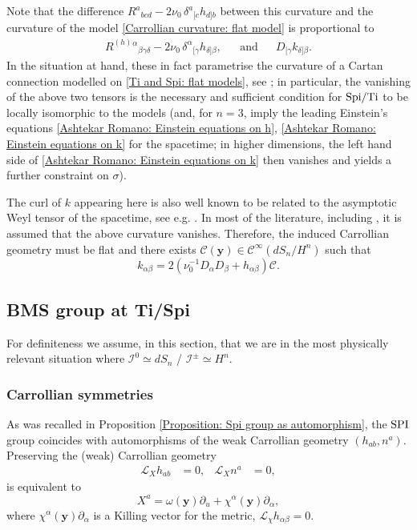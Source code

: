 \documentclass[a4paper, 10pt]{article}
\theoremstyle{remark}
\newcommand{\Ti}{\textnormal{Ti}}
\newcommand{\Spi}{\textnormal{Spi}}
\newcommand{\y}{\bm{y}}
\newcommand{\SPI}{\textnormal{SPI}}%
\begin{document}
Note that the difference $R^a{}_{bcd} - 2 \nu_0\, \delta^{a}{}_{[c}h_{d]b}$ between this curvature and the curvature of the model \eqref{Carrollian curvature: flat model} is proportional to
\begin{align}\label{Carrollian curvature: Cartan curvature}
R^{(h)}{}^{\alpha}{}_{\beta \gamma \delta} - 2 \nu_0\, \delta^{\alpha}{}_{[\gamma}h_{\delta]\beta}, && \textrm{and}&& D_{[\gamma} k_{\delta]\beta}. 
\end{align}
In the situation at hand, these in fact parametrise the curvature of a Cartan connection modelled on \eqref{Ti and Spi: flat models}, see \cite{Herfray:2021qmp}; in particular, the vanishing of the above two tensors is the necessary and sufficient condition for $\Spi/\Ti$ to be locally isomorphic to the models (and, for $n=3$, imply the leading Einstein's equations \eqref{Ashtekar Romano: Einstein equations on h}, \eqref{Ashtekar Romano: Einstein equations on k} for the spacetime; in higher dimensions, the left hand side of \eqref{Ashtekar Romano: Einstein equations on k} then vanishes and yields a further constraint on $\sigma$). 

The curl of $k$ appearing here is also well known to be related to the asymptotic Weyl tensor of the spacetime, see e.g. \cite{Compere:2023qoa}. In most of the literature, including \cite{Compere:2023qoa}, it is assumed that the above curvature vanishes. Therefore, the induced Carrollian geometry must be flat and there exists $\mathcal{C}(\y) \in \mathcal{C}^{\infty}(dS_n/H^n)$ such that
\begin{equation}\label{Carrollian connection: pure gauge condition}
    k_{\alpha\beta} =  2\left( \nu_0^{-1}D_{\alpha} D_{\beta} + h_{\alpha \beta} \right) \mathcal{C}.
\end{equation}


\subsection{BMS group at Ti/Spi}\label{ssection: BMS group at Ti/Spi}

For definiteness we assume, in this section, that we are in the most physically relevant situation where $\mathcal{I}^{0}\simeq dS_n$ / $\mathcal{I}^{\pm}\simeq H^n$.

\subsubsection{Carrollian symmetries}

As was recalled in Proposition \ref{Proposition: Spi group as automorphism}, the $\SPI$ group coincides with automorphisms of the weak Carrollian geometry $(h_{ab}, n^a)$. Preserving the (weak) Carrollian geometry
\begin{align*}
    \mathcal{L}_X h_{ab}&=0, & \mathcal{L}_X n^a&=0, 
\end{align*}
is equivalent to 
\begin{equation*}
    X^a =  \omega(\y) \partial_u + \chi^{\alpha}(\y) \partial_{\alpha},
\end{equation*}
where $\chi^{\alpha}(\y) \partial_{\alpha}$ is a Killing vector for the metric, $\mathcal{L}_{\chi} h_{\alpha\beta }=0$.
\end{document}
